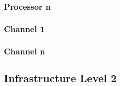 
\subsubsection{Processor n}

\subsubsection{Channel  1}



\subsubsection{Channel  n}

\subsection{Infrastructure Level 2}



